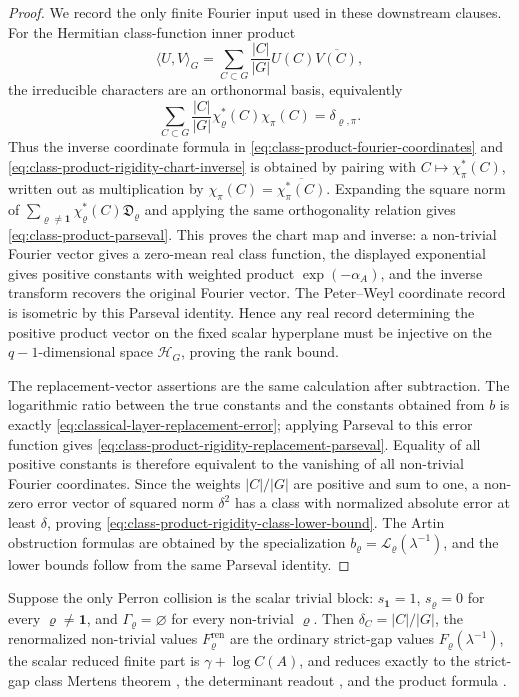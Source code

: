 \begin{proof}
  We record the only finite Fourier input used in these downstream clauses.
  For the Hermitian class-function inner product
  \[
    \langle U,V\rangle_G
    =
    \sum_{C\subset G}\frac{|C|}{|G|}U(C)\overline{V(C)},
  \]
  the irreducible characters are an orthonormal basis, equivalently
  \[
    \sum_{C\subset G}\frac{|C|}{|G|}
      \chi_\varrho^\ast(C)\chi_\pi(C)=\delta_{\varrho,\pi}.
  \]
  Thus the inverse coordinate formula in
  \eqref{eq:class-product-fourier-coordinates} and
  \eqref{eq:class-product-rigidity-chart-inverse} is obtained by pairing
  with \(C\mapsto\chi_\pi^\ast(C)\), written out as multiplication by
  \(\chi_\pi(C)=\overline{\chi_\pi^\ast(C)}\).  Expanding the square norm of
  \(\sum_{\varrho\ne\mathbf1}\chi_\varrho^\ast(C)\mathfrak D_\varrho\) and
  applying the same orthogonality relation gives
  \eqref{eq:class-product-parseval}.  This proves the chart map and inverse:
  a non-trivial Fourier vector gives a zero-mean real class function, the
  displayed exponential gives positive constants with weighted product
  \(\exp(-\alpha_A)\), and the inverse transform recovers the original
  Fourier vector.  The Peter--Weyl coordinate record is isometric by this
  Parseval identity.  Hence any real record determining the positive product
  vector on the fixed scalar hyperplane must be injective on the
  \(q-1\)-dimensional space \(\mathcal H_G\), proving the rank bound.

  The replacement-vector assertions are the same calculation after
  subtraction.  The logarithmic ratio between the true constants and the
  constants obtained from \(b\) is exactly
  \eqref{eq:classical-layer-replacement-error}; applying Parseval to this
  error function gives
  \eqref{eq:class-product-rigidity-replacement-parseval}.  Equality of all
  positive constants is therefore equivalent to the vanishing of all
  non-trivial Fourier coordinates.  Since the weights \(|C|/|G|\) are
  positive and sum to one, a non-zero error vector of squared norm
  \(\delta^2\) has a class with normalized absolute error at least
  \(\delta\), proving
  \eqref{eq:class-product-rigidity-class-lower-bound}.  The Artin
  obstruction formulas are obtained by the specialization
  \(b_\varrho=\mathcal L_\varrho(\lambda^{-1})\), and the lower bounds follow
  from the same Parseval identity.
\end{proof}

\begin{corollary}
  \label{cor:strict-gap-specialization}
  Suppose the only Perron collision is the scalar trivial block:
  \(s_{\mathbf1}=1\), \(s_\varrho=0\) for every
  \(\varrho\ne\mathbf1\), and
  \(\Gamma_\varrho=\varnothing\) for every non-trivial \(\varrho\).  Then
  \(\delta_C=|C|/|G|\), the renormalized non-trivial values
  \(F_\varrho^{\mathrm{ren}}\) are the ordinary strict-gap values
  \(F_\varrho(\lambda^{-1})\), the scalar reduced finite part is
  \(\gamma+\log C(A)\), and
  reduces exactly to the strict-gap class Mertens theorem
  , the determinant readout
  , and the product formula
  .
\end{corollary}

